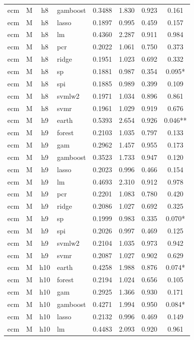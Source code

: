 \begin{ThreePartTable}
\begin{longtable}[t]{llclcccc}
ecm & M & h8 & gamboost & 0.3488 & 1.830 & 0.923 & 0.161\\
ecm & M & h8 & lasso & 0.1897 & 0.995 & 0.459 & 0.157\\
ecm & M & h8 & lm & 0.4360 & 2.287 & 0.911 & 0.984\\
ecm & M & h8 & pcr & 0.2022 & 1.061 & 0.750 & 0.373\\
ecm & M & h8 & ridge & 0.1951 & 1.023 & 0.692 & 0.332\\
ecm & M & h8 & sp & 0.1881 & 0.987 & 0.354 & 0.095*\\
ecm & M & h8 & spi & 0.1885 & 0.989 & 0.399 & 0.109\\
ecm & M & h8 & svmlw2 & 0.1971 & 1.034 & 0.896 & 0.861\\
ecm & M & h8 & svmr & 0.1961 & 1.029 & 0.919 & 0.676\\
\addlinespace
ecm & M & h9 & earth & 0.5393 & 2.654 & 0.926 & 0.046**\\
ecm & M & h9 & forest & 0.2103 & 1.035 & 0.797 & 0.133\\
ecm & M & h9 & gam & 0.2962 & 1.457 & 0.955 & 0.173\\
ecm & M & h9 & gamboost & 0.3523 & 1.733 & 0.947 & 0.120\\
ecm & M & h9 & lasso & 0.2023 & 0.996 & 0.466 & 0.154\\
ecm & M & h9 & lm & 0.4693 & 2.310 & 0.912 & 0.978\\
ecm & M & h9 & pcr & 0.2201 & 1.083 & 0.780 & 0.420\\
ecm & M & h9 & ridge & 0.2086 & 1.027 & 0.692 & 0.325\\
ecm & M & h9 & sp & 0.1999 & 0.983 & 0.335 & 0.070*\\
ecm & M & h9 & spi & 0.2026 & 0.997 & 0.469 & 0.125\\
ecm & M & h9 & svmlw2 & 0.2104 & 1.035 & 0.973 & 0.942\\
ecm & M & h9 & svmr & 0.2087 & 1.027 & 0.902 & 0.629\\
\addlinespace
ecm & M & h10 & earth & 0.4258 & 1.988 & 0.876 & 0.074*\\
ecm & M & h10 & forest & 0.2194 & 1.024 & 0.656 & 0.105\\
ecm & M & h10 & gam & 0.2925 & 1.366 & 0.930 & 0.171\\
ecm & M & h10 & gamboost & 0.4271 & 1.994 & 0.950 & 0.084*\\
ecm & M & h10 & lasso & 0.2132 & 0.996 & 0.469 & 0.149\\
ecm & M & h10 & lm & 0.4483 & 2.093 & 0.920 & 0.961\\

\end{longtable}
\end{ThreePartTable}
